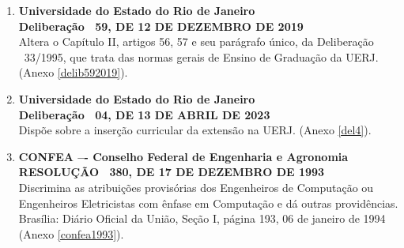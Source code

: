 \begin{enumerate}
      \item \textbf{Universidade do Estado do Rio de Janeiro}  \\
            \textbf{Deliberação ~59, DE 12 DE DEZEMBRO DE 2019}  \\
            Altera o Capítulo II, artigos 56, 57 e seu parágrafo único, da Deliberação ~33/1995, que trata das normas gerais de Ensino de Graduação da UERJ. (Anexo \ref{delib592019}).
      \item \textbf{Universidade do Estado do Rio de Janeiro}  \\
            \textbf{Deliberação ~04, DE 13 DE ABRIL DE 2023}  \\
            Dispõe sobre a inserção curricular da extensão na UERJ. (Anexo \ref{del4}).
      \item \textbf{CONFEA –- Conselho Federal de Engenharia e Agronomia} \\
            \textbf{RESOLUÇÃO ~380, DE 17 DE DEZEMBRO DE 1993}  \\
            Discrimina as atribuições provisórias dos Engenheiros de Computação ou Engenheiros Eletricistas com ênfase em Computação e dá outras providências. Brasília: Diário Oficial da União, Seção I, página 193, 06 de janeiro de 1994 (Anexo \ref{confea1993}).
\end{enumerate}
